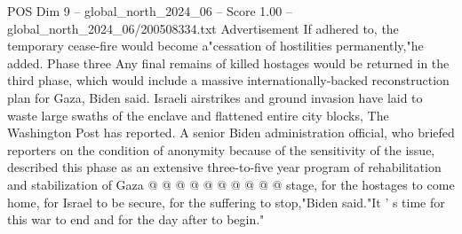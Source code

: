 \begin{textsample}{POS Dim 9 – global\_north\_2024\_06 – Score 1.00 – global\_north\_2024\_06/200508334.txt}
Advertisement If adhered to, the temporary cease-fire would become a"cessation of hostilities permanently,"he added.
Phase three Any final remains of killed hostages would be returned in the third phase, which would include a massive internationally-backed reconstruction plan for Gaza, Biden said.
Israeli airstrikes and ground invasion have laid to waste large swaths of the enclave and flattened entire city blocks, The Washington Post has reported.
A senior Biden administration official, who briefed reporters on the condition of anonymity because of the sensitivity of the issue, described this phase as an extensive three-to-five year program of rehabilitation and stabilization of Gaza @ @ @ @ @ @ @ @ @ @ stage, for the hostages to come home, for Israel to be secure, for the suffering to stop,"Biden said."It ' s time for this war to end and for the day after to begin."

\end{textsample}
